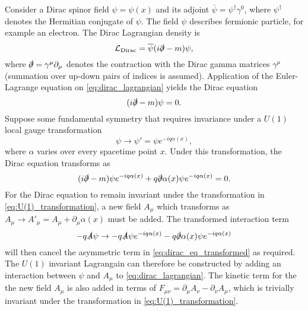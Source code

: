 Consider a Dirac spinor field $\psi = \psi(x)$ and its adjoint $\overline{\psi} = \psi^\dagger \gamma^0$, where $\psi^\dagger$ denotes the Hermitian conjugate of $\psi$.
The field $\psi$ describes fermionic \spinhalf particle, for example an electron.
The Dirac Lagrangian density is
%
\begin{equation}\label{eq:dirac_lagrangian}
  \mathcal{L}_{\textnormal{Dirac}} = \overline{\psi} (i \slashed{\partial}  - m )\psi,
\end{equation}
%
where $\slashed{\partial} = \gamma^\mu \partial_\mu$ denotes the contraction with the Dirac gamma matrices $\gamma^\mu$ (summation over up-down pairs of indices is assumed).
Application of the Euler-Lagrange equation on \cref{eq:dirac_lagrangian} yields the Dirac equation
%
\begin{equation}\label{eq:dirac_eq}
  (i \slashed{\partial}  - m )\psi = 0 .
\end{equation}
%
Suppose some fundamental symmetry that requires invariance under a $U(1)$ local gauge transformation
%
\begin{equation}\label{eq:U(1)_transformation}
  \psi \rightarrow \psi' = \psi e^{- i q \alpha(x)} ,
\end{equation}
%
where $\alpha$ varies over every spacetime point $x$.
Under this transformation, the Dirac equation transforms as 
%
\begin{equation}\label{eq:dirac_eq_transformed}
  (i \slashed{\partial} - m ) \psi e^{- i q \alpha(x)} + q \slashed{\partial}\alpha(x) \psi e^{- i q \alpha(x)} = 0.
\end{equation}
%
For the Dirac equation to remain invariant under the transformation in \cref{eq:U(1)_transformation}, a new field $A_\mu$ which transforms as $A_\mu \rightarrow A'_\mu = A_\mu + \partial_\mu \alpha(x)$ must be added.
The transformed interaction term
%
\begin{equation}
  - q \slashed{A} \psi \rightarrow - q \slashed{A} \psi e^{- i q \alpha(x)} - q \slashed{\partial} \alpha(x) \psi e^{- i q \alpha(x)}
\end{equation}
%
will then cancel the asymmetric term in \cref{eq:dirac_eq_transformed} as required.
The $U(1)$ invariant Lagrangain can therefore be constructed by adding an interaction between $\psi$ and $A_\mu$ to \cref{eq:dirac_lagrangian}. The kinetic term for the the new field $A_\mu$ is also added in terms of $F_{\mu\nu} = \partial_\mu A_\nu - \partial_\nu A_\mu$, which is trivially invariant under the transformation in \cref{eq:U(1)_transformation}.
